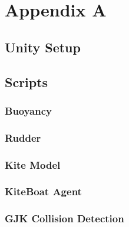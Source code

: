 %
%

\chapter{Appendix A}\label{app:app01}

\section{Unity Setup}\label{sec:unity_setup}

\section{Scripts}

\subsection{Buoyancy}\label{sec:buoyancy}

\subsection{Rudder}\label{sec:rudder}

\subsection{Kite Model}\label{sec:kite}

\subsection{KiteBoat Agent}\label{sec:kiteboat_agent}

\subsection{GJK Collision Detection}\label{sec:gjk}


